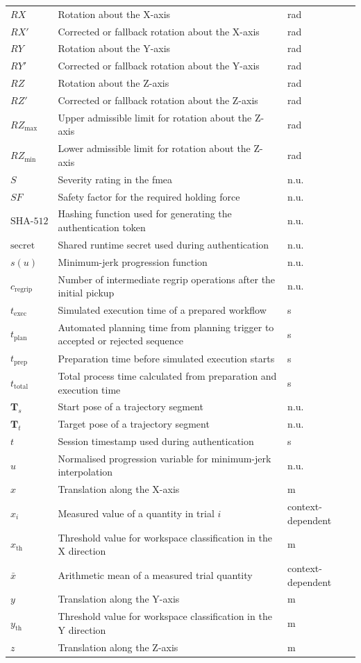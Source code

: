 {\begin{longtable}{@{}L{3.0cm}L{9.8cm}L{2.2cm}@{}}
    $RX$ & Rotation about the X-axis & \si{\radian}\tabularnewline
    $RX'$ & Corrected or fallback rotation about the X-axis & \si{\radian}\tabularnewline
    $RY$ & Rotation about the Y-axis & \si{\radian}\tabularnewline
    $RY'$ & Corrected or fallback rotation about the Y-axis & \si{\radian}\tabularnewline
    $RZ$ & Rotation about the Z-axis & \si{\radian}\tabularnewline
    $RZ'$ & Corrected or fallback rotation about the Z-axis & \si{\radian}\tabularnewline
    $RZ_{\max}$ & Upper admissible limit for rotation about the Z-axis & \si{\radian}\tabularnewline
    $RZ_{\min}$ & Lower admissible limit for rotation about the Z-axis & \si{\radian}\tabularnewline
    $S$ & Severity rating in the \acs{fmea} & n.u.\tabularnewline
    $SF$ & Safety factor for the required holding force & n.u.\tabularnewline
    $\mathrm{SHA\text{-}512}$ & Hashing function used for generating the authentication token & n.u.\tabularnewline
    $\text{secret}$ & Shared runtime secret used during authentication & n.u.\tabularnewline
    $s(u)$ & Minimum-jerk progression function & n.u.\tabularnewline
    $c_{\mathrm{regrip}}$ & Number of intermediate regrip operations after the initial pickup & n.u.\tabularnewline
    $t_{\mathrm{exec}}$ & Simulated execution time of a prepared workflow & \si{\second}\tabularnewline
    $t_{\mathrm{plan}}$ & Automated planning time from planning trigger to accepted or rejected sequence & \si{\second}\tabularnewline
    $t_{\mathrm{prep}}$ & Preparation time before simulated execution starts & \si{\second}\tabularnewline
    $t_{\mathrm{total}}$ & Total process time calculated from preparation and execution time & \si{\second}\tabularnewline
    $\mathbf{T}_s$ & Start pose of a trajectory segment & n.u.\tabularnewline
    $\mathbf{T}_t$ & Target pose of a trajectory segment & n.u.\tabularnewline
    $t$ & Session timestamp used during authentication & \si{\second}\tabularnewline
    $u$ & Normalised progression variable for minimum-jerk interpolation & n.u.\tabularnewline
    $x$ & Translation along the X-axis & \si{\metre}\tabularnewline
    $x_i$ & Measured value of a quantity in trial $i$ & context-dependent\tabularnewline
    $x_{\text{th}}$ & Threshold value for workspace classification in the X direction & \si{\metre}\tabularnewline
    $\bar{x}$ & Arithmetic mean of a measured trial quantity & context-dependent\tabularnewline
    $y$ & Translation along the Y-axis & \si{\metre}\tabularnewline
    $y_{\text{th}}$ & Threshold value for workspace classification in the Y direction & \si{\metre}\tabularnewline
    $z$ & Translation along the Z-axis & \si{\metre}\tabularnewline
  \end{longtable}%
}
